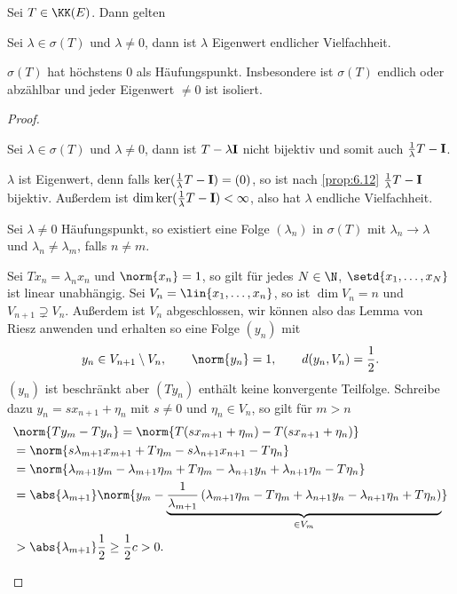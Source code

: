 \begin{prop}
\label{prop:6.13}
Sei $T\in\KK(E)$. Dann gelten
\begin{propenum}
  \item Sei $\lambda\in\sigma(T)$ und $\lambda\neq 0$, dann ist $\lambda$
  Eigenwert endlicher Vielfachheit.
  \item $\sigma(T)$ hat höchstens $0$ als Häufungspunkt. Insbesondere ist
  $\sigma(T)$ endlich oder abzählbar und jeder Eigenwert $\neq 0$ ist
  isoliert.\fishhere
\end{propenum}
\end{prop}
\begin{proof}
\begin{proofenum}
  \item Sei $\lambda\in\sigma(T)$ und $\lambda\neq 0$, dann ist $T-\lambda \mathbf{I}$
  nicht bijektiv und somit auch $\frac{1}{\lambda}T-\mathbf{I}$.
  
  $\lambda$ ist Eigenwert, denn falls $\ker (\frac{1}{\lambda}T-\mathbf{I}) = (0)$, so
  ist nach \ref{prop:6.12} $\frac{1}{\lambda}T-\mathbf{I}$ bijektiv. Außerdem ist
  $\dim \ker (\frac{1}{\lambda}T-\mathbf{I})< \infty$, also hat $\lambda$ endliche
  Vielfachheit.
  \item Sei $\lambda\neq 0$ Häufungspunkt, so existiert eine Folge
  $(\lambda_n)$ in $\sigma(T)$ mit $\lambda_n\to\lambda$ und $\lambda_n\neq
  \lambda_m$, falls $n\neq m$.
  
  Sei $Tx_n = \lambda_n x_n$ und $\norm{x_n}=1$, so gilt für jedes $N\in\N$,
$\setd{x_1,\ldots,x_N}$
ist linear unabhängig. Sei $V_n=\lin{x_1,\ldots,x_n}$, so ist $\dim V_n = n$
und $V_{n+1}\supsetneq V_n$. Außerdem ist $V_n$ abgeschlossen, wir können also
das Lemma von Riesz anwenden und erhalten so eine Folge $(y_n)$ mit
\begin{align*}
y_n\in V_{n+1}\setminus V_n,\qquad \norm{y_n} = 1,\qquad d(y_n,V_n)=
\frac{1}{2}.
\end{align*}
$(y_n)$ ist beschränkt aber $(Ty_n)$ enthält keine konvergente Teilfolge.
Schreibe dazu $y_n=sx_{n+1} + \eta_n$ mit $s\neq 0$ und $\eta_n\in
V_n$, so gilt für $m>n$
\begin{align*}
&\norm{Ty_m-Ty_n} = \norm{T(sx_{m+1}+\eta_m)-T(sx_{n+1}+\eta_n)}\\
&= \norm{s\lambda_{m+1}x_{m+1}+T\eta_m - s\lambda_{n+1}x_{n+1}-T\eta_n}\\
&= \norm{\lambda_{m+1}y_m - \lambda_{m+1}\eta_m+T\eta_m - \lambda_{n+1}y_n +
\lambda_{n+1}\eta_n -T\eta_n}\\
&= \abs{\lambda_{m+1}}\norm{y_m -
\underbrace{\frac{1}{\lambda_{m+1}}\left(\lambda_{m+1}\eta_m-T\eta_m +
\lambda_{n+1}y_n -
\lambda_{n+1}\eta_n +T\eta_n\right)}_{\in V_m}}\\
&> \abs{\lambda_{m+1}}\frac{1}{2} \ge \frac{1}{2}c > 0.\qedhere
\end{align*}
\end{proofenum}
\end{proof}

